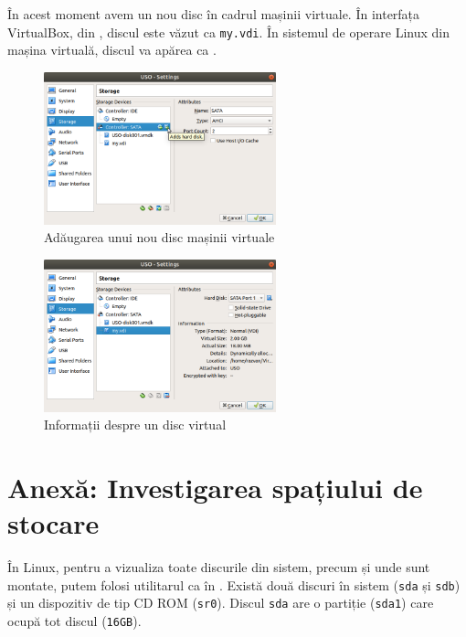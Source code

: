 În acest moment avem un nou disc în cadrul mașinii virtuale.
 În interfața VirtualBox, din , discul este văzut ca \texttt{my.vdi}.
 În sistemul de operare Linux din mașina virtuală, discul va apărea ca .

\begin{figure}[!htbp]
  \centering
  \includegraphics[width=0.6\textwidth]{chapters/10-storage/img/vm-new-disk.png}
  \caption{Adăugarea unui nou disc mașinii virtuale}
  \label{fig:storage:vm-new-disk}
\end{figure}

\begin{figure}[!htbp]
  \centering
  \includegraphics[width=0.6\textwidth]{chapters/10-storage/img/vm-disk-info.png}
  \caption{Informații despre un disc virtual}
  \label{fig:storage:vm-disk-info}
\end{figure}

\section{Anexă: Investigarea spațiului de stocare}
\label{sec:storage:investigate-cmd}

În Linux, pentru a vizualiza toate discurile din sistem, precum și unde sunt montate, putem folosi utilitarul  ca în .
 Există două discuri în sistem (\texttt{sda} și \texttt{sdb}) și un dispozitiv de tip CD ROM (\texttt{sr0}).
 Discul \texttt{sda} are o partiție (\texttt{sda1}) care ocupă tot discul (\texttt{16GB}).

